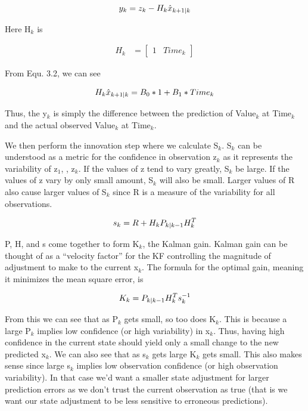   \begin{equation}
  \centering
  y_{k} = z_{k} - H_{k}\hat{x}_{k+1|k}
  \end{equation}
  
  Here H$_{k}$ is
  
  \begin{align}
    H_{k} &= \begin{bmatrix}
           1&Time_{k}
         \end{bmatrix}
  \end{align}
  
  From Equ. 3.2, we can see 
  
  \begin{equation}
  \centering
H_{k}\hat{x}_{k+1|k} = B_{0}*1 + B_{1}*Time_{k}
  \end{equation}
  
  Thus, the y$_{k}$ is simply the difference between the prediction of Value$_{k}$ at Time$_{k}$ and the actual observed Value$_{k}$ at Time$_{k}$.
  
  We then perform the innovation step where we calculate S$_{k}$. S$_{k}$ can be understood as a metric for the confidence in observation z$_{k}$ as it represents the variability of z$_{1}$, \cdots , z$_{k}$. If the values of z tend to vary greatly, S$_{k}$ be large. If the values of z vary by only small amount, S$_{k}$ will also be small. Larger values of R also cause larger values of S$_{k}$ since R is a measure of the variability for all observations.
  
  \begin{equation}
  \centering
s_{k} = R + H_{k}P_{k|k-1}H_{k}^{T}
  \end{equation}
  
  P, H, and s come together to form K$_{k}$, the Kalman gain. Kalman gain can be thought of as a “velocity factor” for the KF controlling the magnitude of adjustment to make to the current x$_{k}$. The formula for the optimal gain, meaning it minimizes the mean square error, is  
  
    \begin{equation}
  \centering
K_{k} = P_{k|k-1}H_{k}^{T}s_{k}^{-1}
  \end{equation}
  
  From this we can see that as P$_{k}$ gets small, so too does K$_{k}$. This is because a large P$_{k}$ implies low confidence (or high variability) in x$_{k}$. Thus, having high confidence in the current state should yield only a small change to the new predicted x$_{k}$. We can also see that as s$_{k}$ gets large K$_{k}$ gets small. This also makes sense since large s$_{k}$ implies low observation confidence (or high observation variability). In that case we'd want a smaller state adjustment for larger prediction errors as we don't trust the  current observation as true (that is we want our state adjustment to be less sensitive to erroneous predictions).
  
